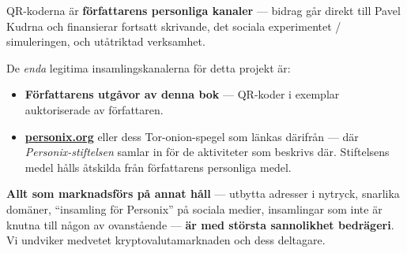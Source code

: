 \begin{minipage}[t]{0.60\textwidth}
\vspace{0pt}
\begin{mdframed}[
  linewidth=0.7pt,roundcorner=5pt,
  innerleftmargin=10pt,innerrightmargin=10pt,
  innertopmargin=8pt,innerbottommargin=8pt,
  skipabove=0pt,skipbelow=0pt,
  linecolor=cbwarning!50,backgroundcolor=cbwarning!5,
  nobreak=true,
  needspace=4\baselineskip,
]
\footnotesize
QR-koderna är \textbf{författarens personliga kanaler} --- bidrag går direkt till Pavel Kudrna och finansierar fortsatt skrivande, det sociala experimentet / simuleringen, och utåtriktad verksamhet.

\smallskip
De \emph{enda} legitima insamlingskanalerna för detta projekt är:

\smallskip
\begin{itemize}
\setlength{\itemsep}{0pt}
\setlength{\topsep}{0pt}
\item \textbf{Författarens utgåvor av denna bok} --- QR-koder i exemplar auktoriserade av författaren.
\item \href{https://personix.org}{\textbf{personix.org}} eller dess Tor-onion-spegel som länkas därifrån --- där \emph{Personix-stiftelsen} samlar in för de aktiviteter som beskrivs där. Stiftelsens medel hålls åtskilda från författarens personliga medel.
\end{itemize}

\smallskip
\textbf{Allt som marknadsförs på annat håll} --- utbytta adresser i nytryck, snarlika domäner, ``insamling för Personix'' på sociala medier, insamlingar som inte är knutna till någon av ovanstående --- \textbf{är med största sannolikhet bedrägeri}. Vi undviker medvetet kryptovalutamarknaden och dess deltagare.
\end{mdframed}
\end{minipage}

\clearpage
